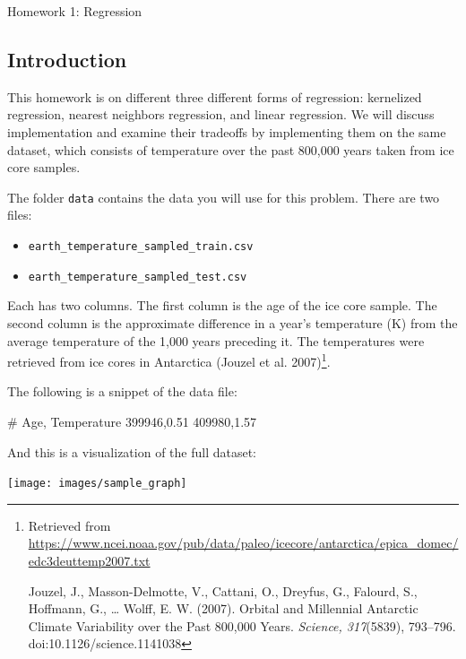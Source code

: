 \documentclass[submit]{harvardml}
\begin{document}
\begin{center}
{\Large Homework 1: Regression}\\
\end{center}

\subsection*{Introduction}
This homework is on different three different forms of regression:
kernelized regression, nearest neighbors regression, and linear
regression.  We will discuss implementation and examine their
tradeoffs by implementing them on the same dataset, which consists of
temperature over the past 800,000 years taken from ice core samples.

The folder \verb|data| contains the data you will use for this
problem. There are two files:
\begin{itemize}
    \item \verb|earth_temperature_sampled_train.csv| 
    \item \verb|earth_temperature_sampled_test.csv|
\end{itemize} 

Each has two columns.  The first column is the age of the ice core
sample.  The second column is the approximate difference in a year's temperature (K) 
from the average temperature of the 1,000 years preceding it. The temperatures were retrieved from ice cores in
Antarctica (Jouzel et al. 2007)\footnote{Retrieved from
\url{https://www.ncei.noaa.gov/pub/data/paleo/icecore/antarctica/epica_domec/edc3deuttemp2007.txt}

Jouzel, J., Masson-Delmotte, V., Cattani, O., Dreyfus, G., Falourd, 
S., Hoffmann, G., … Wolff, E. W. (2007). Orbital and Millennial 
Antarctic Climate Variability over the Past 800,000 Years. 
\emph{Science, 317}(5839), 793–796. doi:10.1126/science.1141038}.
 
The following is a snippet of the data file:

 
\begin{csv}
# Age, Temperature
399946,0.51
409980,1.57
\end{csv}

\noindent And this is a visualization of the full dataset: 
\begin{center}
  \texttt{[image: images/sample\_graph]}
    \end{center}
  \noindent 
\end{document}
